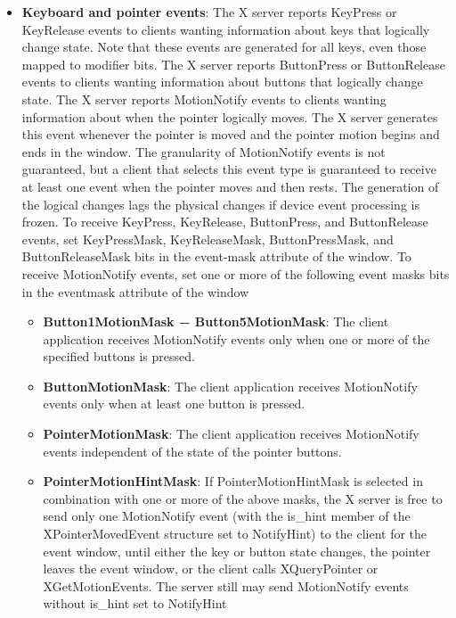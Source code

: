 \documentclass{report}
\begin{document}
\begin{itemize}
        \item \textbf{Keyboard and pointer events}: The X server reports KeyPress or KeyRelease events to clients wanting information about keys that logically change state. Note that these events are generated for all keys, even those mapped to modifier bits. The X server reports ButtonPress or ButtonRelease events to clients wanting information about buttons that logically change state.
            \bigbreak \noindent 
            The X server reports MotionNotify events to clients wanting information about when the pointer logically moves. The X server generates this event whenever the pointer is moved and the pointer motion begins and ends in the window. The granularity of MotionNotify events is not guaranteed, but a client that selects this event type is guaranteed to receive at least one event when the pointer moves and then rests.
            \bigbreak \noindent 
            The generation of the logical changes lags the physical changes if device event processing is frozen.
            \bigbreak \noindent 
            To receive KeyPress, KeyRelease, ButtonPress, and ButtonRelease events, set KeyPressMask, KeyReleaseMask, ButtonPressMask, and ButtonReleaseMask bits in the event-mask attribute of the window.
            \bigbreak \noindent 
            To receive MotionNotify events, set one or more of the following event masks bits in the eventmask attribute of the window
            \begin{itemize}
                \item \textbf{Button1MotionMask − Button5MotionMask}: The client application receives MotionNotify events only when one or more of the specified buttons is pressed.
                \item \textbf{ButtonMotionMask}: The client application receives MotionNotify events only when at least one button is pressed.
                \item \textbf{PointerMotionMask}: The client application receives MotionNotify events independent of the state of the pointer buttons.
                \item \textbf{PointerMotionHintMask}: If PointerMotionHintMask is selected in combination with one or more of the above masks, the X server is free to send only one MotionNotify event (with the is\_hint member of the XPointerMovedEvent structure set to NotifyHint) to the client for the event window, until either the key or button state changes, the pointer leaves the event window, or the client calls XQueryPointer or XGetMotionEvents. The server still may send MotionNotify events without is\_hint set to NotifyHint

\end{itemize}
\end{itemize}
\end{document}
